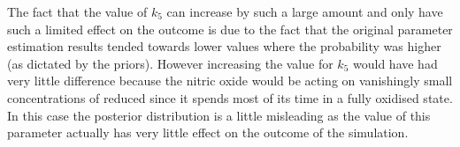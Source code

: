 The fact that the value of $k_5$ can increase by such a large amount and only have such a limited effect on the outcome is due to the fact that the original parameter estimation results tended towards lower values where the probability was higher (as dictated by the priors). However increasing the value for $k_5$ would have had very little difference because the nitric oxide would be acting on vanishingly small concentrations of reduced \cbbthree{} since it spends most of its time in a fully oxidised state. In this case the posterior distribution is a little misleading as the value of this parameter actually has very little effect on the outcome of the simulation.